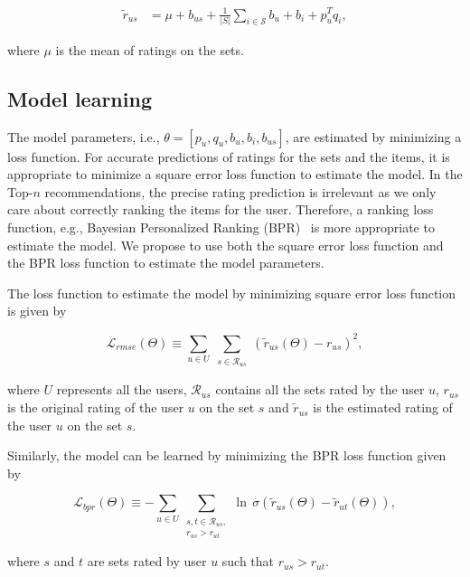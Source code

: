 \begin{equation} \label{avgSetWGBiasEq}
  \begin{split}
    \tilde{r}_{us} &= \mu + b_{us} + \frac{1}{|S|} \sum_{i \in \mathcal{S}} b_u + b_i + p_u^Tq_i,
  \end{split}
\end{equation}

\noindent where $\mu$ is the mean of ratings on the sets.

\subsection{Model learning}
The model parameters, i.e., $\theta= [p_u, q_u, b_u, b_i, b_{us}]$, are estimated 
by minimizing a loss function. 
For accurate predictions of ratings for the sets and the items, it is
appropriate to minimize a square error loss function to estimate the model. In
the Top-$n$  recommendations, the precise rating prediction is irrelevant as we
only care about correctly ranking the items for the user. Therefore, a ranking
loss function, e.g., Bayesian Personalized Ranking (BPR)~\cite{r6} is more appropriate to
estimate the model. We propose to use both the square error loss function and
the BPR loss function to estimate the model parameters.

The loss function to estimate the model by minimizing square error loss function
is given by
 
%
\begin{equation} \label{eq_rmse}
  \mathcal{L}_{rmse}(\Theta) \equiv \sum_{u \in U} \sum_{\substack{s \in
  \mathcal{R}_{us}}} (\tilde{r}_{us}(\Theta) - r_{us})^2,
\end{equation}
%


where $U$ represents all the users, $\mathcal{R}_{us}$ contains all the sets rated 
by the user $u$, $r_{us}$ is the original rating of the user $u$ on the set $s$ 
and $\tilde{r}_{us}$ is the estimated rating of the user $u$ on the set $s$. 


Similarly, the model can be learned by minimizing the BPR loss function given by

\begin{equation} \label{eq_bpr}
\mathcal{L}_{bpr}(\Theta) \equiv - \sum_{u \in U} \sum_{\substack{s,t \in
\mathcal{R}_{us} ,\\  r_{us} > r_{ut}}}  \ln \, \sigma(\tilde{r}_{us}(\Theta) -
\tilde{r}_{ut}(\Theta) ),
\end{equation}

\noindent where $s$ and $t$ are sets rated by user $u$ such that $r_{us} >
r_{ut}$.


